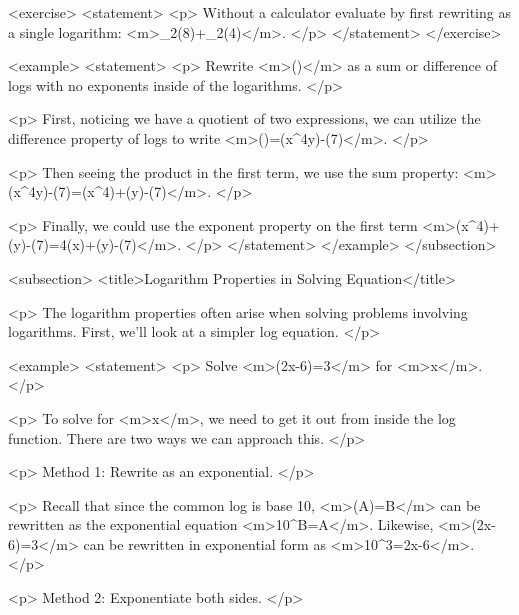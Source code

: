         <exercise>
            <statement>
                <p>
                    Without a calculator evaluate by first rewriting as a single logarithm: <m>\log_{2}(8)+\log_{2}(4)</m>.
                </p>
            </statement>
        </exercise>

        <example>
            <statement>
                <p>
                    Rewrite <m>\ln⁡()</m> as a sum or difference of logs with no exponents inside of the logarithms.
                </p>

                <p>
                    First, noticing we have a quotient of two expressions, we can utilize the difference property of logs to write <m>\ln()=\ln(x^{4}y)-\ln(7)</m>.
                </p>

                <p>
                    Then seeing the product in the first term, we use the sum property: <m>\ln(x^{4}y)-\ln(7)=\ln(x^{4})+\ln(y)-\ln(7)</m>.
                </p>

                <p>
                    Finally, we could use the exponent property on the first term <m>\ln(x^{4})+\ln(y)-\ln(7)=4\ln(x)+\ln(y)-\ln(7)</m>.
                </p>
            </statement>
        </example>
    </subsection>


    <subsection>
        <title>Logarithm Properties in Solving Equation</title>

        <p>
            The logarithm properties often arise when solving problems involving logarithms.
            First, we’ll look at a simpler log equation.
        </p>

        <example>
            <statement>
                <p>
                    Solve <m>\log(2x-6)=3</m> for <m>x</m>.
                </p>

                <p>
                    To solve for <m>x</m>, we need to get it out from inside the log function.
                    There are two ways we can approach this.
                </p>

                <p>
                    Method 1: Rewrite as an exponential.
                </p>

                <p>
                    Recall that since the common log is base 10, <m>\log(A)=B</m> can be rewritten as the exponential equation <m>10^{B}=A</m>.
                    Likewise, <m>\log(2x-6)=3</m> can be rewritten in exponential form as <m>10^{3}=2x-6</m>.
                </p>

                <p>
                    Method 2: Exponentiate both sides.
                </p>

